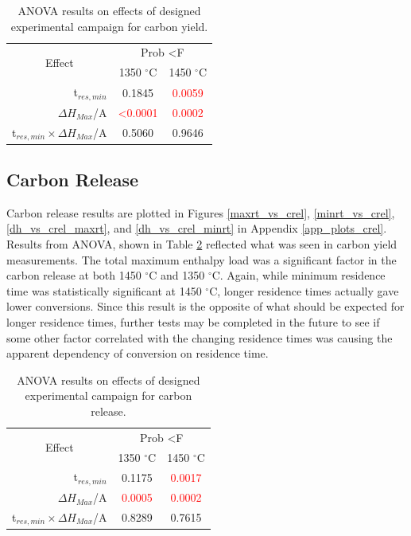 \documentclass[11pt,twocolumn]{article}
\begin{document}
\begin{table}
	\centering
	\caption{ANOVA results on effects of designed experimental campaign for carbon yield.}
	\begin{tabular}{r c c}
		\toprule
		\multicolumn{1}{c}{\multirow{2}{*}{Effect}}		& 	\multicolumn{2}{c}{Prob \textless F	}	\\
		{}								&	1350 $^\circ$C					&	1450 $^\circ$C			\\
		\midrule
		t$_{res,min}$						&	0.1845						&	\textcolor{red}{0.0059}	\\
		$\Delta H_{Max}$/A					&	\textcolor{red}{\textless 0.0001}	&	\textcolor{red}{0.0002}	\\
		t$_{res,min}\times \Delta H_{Max}$/A	&	0.5060						&	0.9646				\\
		\bottomrule
	\end{tabular}
	\label{anova_cyield}
\end{table}

\subsection*{Carbon Release}

Carbon release results are plotted in Figures \ref{maxrt_vs_crel}, \ref{minrt_vs_crel}, \ref{dh_vs_crel_maxrt}, and \ref{dh_vs_crel_minrt} in Appendix \ref{app_plots_crel}.  Results from ANOVA, shown in Table \ref{anova_crel} reflected what was seen in carbon yield measurements.  The total maximum enthalpy load was a significant factor in the carbon release at both 1450 $^\circ$C and 1350 $^\circ$C.  Again, while minimum residence time was statistically significant at 1450 $^\circ$C, longer residence times actually gave lower conversions.  Since this result is the opposite of what should be expected for longer residence times, further tests may be completed in the future to see if some other factor correlated with the changing residence times was causing the apparent dependency of conversion on residence time.

\begin{table}
	\centering
	\caption{ANOVA results on effects of designed experimental campaign for carbon release.}
	\begin{tabular}{r c c}
		\toprule
		\multicolumn{1}{c}{\multirow{2}{*}{Effect}}		& 	\multicolumn{2}{c}{Prob \textless F	}	\\
		{}								&	1350 $^\circ$C			&	1450 $^\circ$C			\\
		\midrule
		t$_{res,min}$						&	0.1175				&	\textcolor{red}{0.0017}	\\
		$\Delta H_{Max}$/A					&	\textcolor{red}{0.0005}	&	\textcolor{red}{0.0002}	\\
		t$_{res,min}\times \Delta H_{Max}$/A	&	0.8289				&	0.7615				\\
		\bottomrule
	\end{tabular}
	\label{anova_crel}
\end{table}
\end{document}
